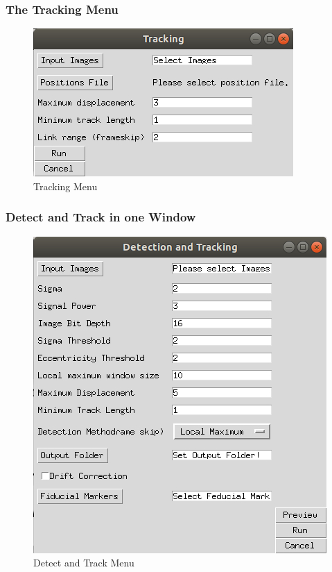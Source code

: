 \documentclass[oneside,letterpaper]{scrartcl}
\def\myscale{0.55}
\begin{document}
\subsubsection{The Tracking Menu}
\begin{figure}
\centering
\includegraphics[scale=\myscale]{Figures/TrackingGUI.jpg}
\caption{Tracking Menu}
\end{figure}
\blindtext

\subsubsection{Detect and Track in one Window}
\begin{figure}
\centering
\includegraphics[scale=\myscale]{Figures/DetandTrackGUI.jpg}
\caption{Detect and Track Menu}
\end{figure}
\blindtext
\end{document}
